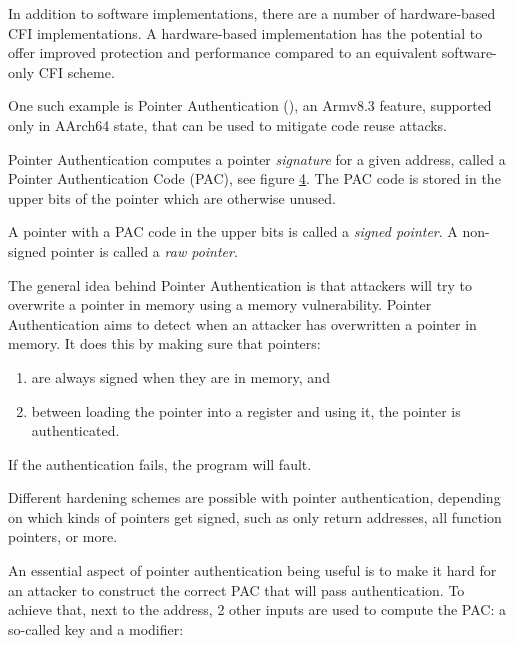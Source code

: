 \documentclass[
  a4paper,
]{report}
\providecommand{\tightlist}{%
  \setlength{\itemsep}{0pt}\setlength{\parskip}{0pt}}
\begin{document}
In addition to software implementations, there are a number of
hardware-based CFI implementations. A hardware-based implementation has
the potential to offer improved protection and performance compared to
an equivalent software-only CFI scheme.

One such example is \label{__index_entry_51}{Pointer
Authentication}
(), an Armv8.3 feature,
supported only in AArch64 state, that can be used to mitigate code reuse
attacks.

Pointer Authentication computes a pointer \emph{signature} for a given
address, called a \label{__index_entry_52}{Pointer
Authentication Code (PAC)}, see
figure \hyperref[fig:pauth-sign-auth]{4}. The PAC code is stored in the
upper bits of the pointer which are otherwise unused.

A pointer with a PAC code in the upper bits is called a
\emph{\label{__index_entry_53}{signed
pointer}}. A non-signed pointer is called a
\emph{\label{__index_entry_54}{raw
pointer}}.

The general idea behind Pointer Authentication is that attackers will
try to overwrite a pointer in memory using a memory vulnerability.
Pointer Authentication aims to detect when an attacker has overwritten a
pointer in memory. It does this by making sure that pointers:

\begin{enumerate}
\def\labelenumi{\arabic{enumi}.}
\tightlist
\item
  are always signed when they are in memory, and
\item
  between loading the pointer into a register and using it, the pointer
  is authenticated.
\end{enumerate}

If the authentication fails, the program will fault.

Different hardening schemes are possible with pointer authentication,
depending on which kinds of pointers get signed, such as only return
addresses, all function pointers, or more.

An essential aspect of pointer authentication being useful is to make it
hard for an attacker to construct the correct PAC that will pass
authentication. To achieve that, next to the address, 2 other inputs are
used to compute the PAC: a so-called
\label{__index_entry_55}{key} and a
\label{__index_entry_56}{modifier}:
\end{document}
